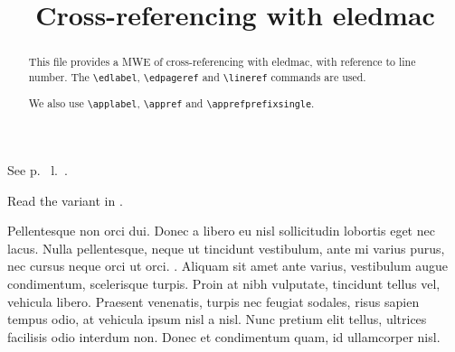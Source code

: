 \documentclass{article}
\renewcommand{\apprefprefixsingle}{l.~}
\begin{document}
\begin{english}
\title{Cross-referencing with eledmac}
\date{}
\maketitle
\begin{abstract}
This file provides a MWE of cross-referencing with eledmac, with reference to line number.
The \verb+\edlabel+, \verb+\edpageref+ and \verb+\lineref+ commands are used. 

We also use \verb+\applabel+, \verb+\appref+ and \verb+\apprefprefixsingle+.

\end{abstract}
\end{english}

See p.~ l.~.

Read the variant in .

\beginnumbering

\pstart
Pellentesque non orci dui. Donec a libero eu nisl sollicitudin lobortis eget nec lacus. Nulla pellentesque, neque ut tincidunt vestibulum, ante mi varius purus, nec cursus neque orci ut orci. . Aliquam sit amet ante varius, vestibulum augue condimentum, scelerisque turpis. Proin at nibh vulputate, tincidunt tellus vel, vehicula libero. Praesent venenatis, turpis nec feugiat sodales, risus sapien tempus odio, at vehicula ipsum nisl a nisl. Nunc pretium elit tellus, ultrices facilisis odio interdum non. Donec et condimentum quam, id ullamcorper nisl.
\pend

\endnumbering
\end{document}
